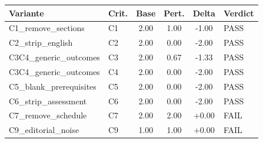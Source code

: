 \begin{tabularx}{\textwidth}{l l S[table-format=1.2] S[table-format=1.2] S[table-format=+1.2] l}
  \toprule
  Variante & Crit. & {Base} & {Pert.} & {Delta} & Verdict \\
  \midrule
  C1\_remove\_sections & C1 & 2.00 & 1.00 & -1.00 & PASS \\
  C2\_strip\_english & C2 & 2.00 & 0.00 & -2.00 & PASS \\
  C3C4\_generic\_outcomes & C3 & 2.00 & 0.67 & -1.33 & PASS \\
  C3C4\_generic\_outcomes & C4 & 2.00 & 0.00 & -2.00 & PASS \\
  C5\_blank\_prerequisites & C5 & 2.00 & 0.00 & -2.00 & PASS \\
  C6\_strip\_assessment & C6 & 2.00 & 0.00 & -2.00 & PASS \\
  C7\_remove\_schedule & C7 & 2.00 & 2.00 & +0.00 & FAIL \\
  C9\_editorial\_noise & C9 & 1.00 & 1.00 & +0.00 & FAIL \\
  \bottomrule
\end{tabularx}
